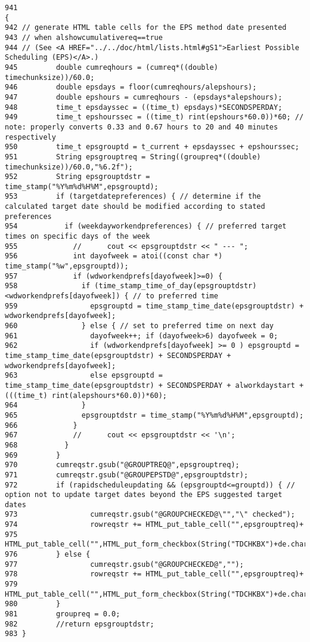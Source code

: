 \footnotesize\begin{verbatim}941                                                                                                                                                     {
942 // generate HTML table cells for the EPS method date presented
943 // when alshowcumulativereq==true
944 // (See <A HREF="../../doc/html/lists.html#gS1">Earliest Possible Scheduling (EPS)</A>.)
945         double cumreqhours = (cumreq*((double) timechunksize))/60.0;
946         double epsdays = floor(cumreqhours/alepshours);
947         double epshours = cumreqhours - (epsdays*alepshours);
948         time_t epsdayssec = ((time_t) epsdays)*SECONDSPERDAY;
949         time_t epshourssec = ((time_t) rint(epshours*60.0))*60; // note: properly converts 0.33 and 0.67 hours to 20 and 40 minutes respectively
950         time_t epsgrouptd = t_current + epsdayssec + epshourssec;
951         String epsgrouptreq = String((groupreq*((double) timechunksize))/60.0,"%6.2f");
952         String epsgrouptdstr = time_stamp("%Y%m%d%H%M",epsgrouptd);
953         if (targetdatepreferences) { // determine if the calculated target date should be modified according to stated preferences
954           if (weekdayworkendpreferences) { // preferred target times on specific days of the week
955             //      cout << epsgrouptdstr << " --- ";
956             int dayofweek = atoi((const char *) time_stamp("%w",epsgrouptd));
957             if (wdworkendprefs[dayofweek]>=0) {
958               if (time_stamp_time_of_day(epsgrouptdstr)<wdworkendprefs[dayofweek]) { // to preferred time
959                 epsgrouptd = time_stamp_time_date(epsgrouptdstr) + wdworkendprefs[dayofweek];
960               } else { // set to preferred time on next day
961                 dayofweek++; if (dayofweek>6) dayofweek = 0;
962                 if (wdworkendprefs[dayofweek] >= 0 ) epsgrouptd = time_stamp_time_date(epsgrouptdstr) + SECONDSPERDAY + wdworkendprefs[dayofweek];
963                 else epsgrouptd = time_stamp_time_date(epsgrouptdstr) + SECONDSPERDAY + alworkdaystart + (((time_t) rint(alepshours*60.0))*60);
964               }
965               epsgrouptdstr = time_stamp("%Y%m%d%H%M",epsgrouptd);
966             }
967             //      cout << epsgrouptdstr << '\n';
968           }
969         }
970         cumreqstr.gsub("@GROUPTREQ@",epsgrouptreq);
971         cumreqstr.gsub("@GROUPEPSTD@",epsgrouptdstr);
972         if (rapidscheduleupdating && (epsgrouptd<=grouptd)) { // option not to update target dates beyond the EPS suggested target dates
973                 cumreqstr.gsub("@GROUPCHECKED@\"","\" checked");
974                 rowreqstr += HTML_put_table_cell("",epsgrouptreq)+
975                            HTML_put_table_cell("",HTML_put_form_checkbox(String("TDCHKBX")+de.chars(),"noupdate","",true)+HTML_put_form_text(String("TD")+de.chars(),epsgrouptdstr,12));
976         } else {
977                 cumreqstr.gsub("@GROUPCHECKED@","");
978                 rowreqstr += HTML_put_table_cell("",epsgrouptreq)+
979                            HTML_put_table_cell("",HTML_put_form_checkbox(String("TDCHKBX")+de.chars(),"noupdate","")+HTML_put_form_text(String("TD")+de.chars(),epsgrouptdstr,12));
980         }
981         groupreq = 0.0;
982         //return epsgrouptdstr;
983 }
\end{verbatim}\normalsize 
